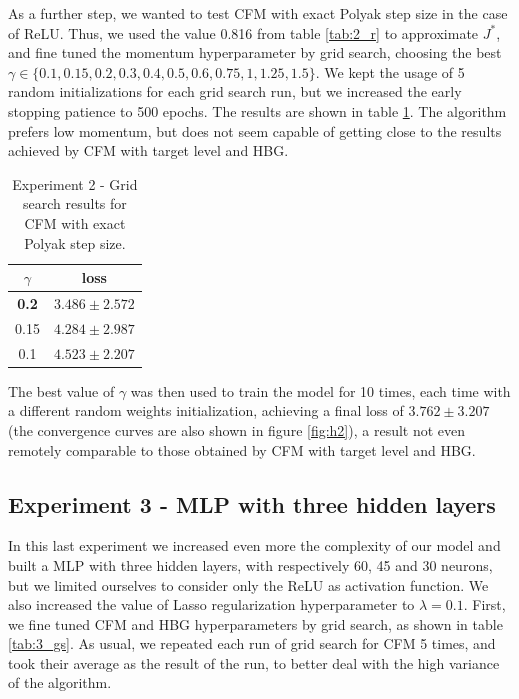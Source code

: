 As a further step, we wanted to test CFM with exact Polyak step size in the case of ReLU. Thus, we used the value 0.816 from table \ref{tab:2_r} to approximate $J^*$, and fine tuned the momentum hyperparameter by grid search, choosing the best $\gamma \in \{0.1, 0.15, 0.2, 0.3, 0.4, 0.5, 0.6, 0.75, 1, 1.25, 1.5\}$. We kept the usage of 5 random initializations for each grid search run, but we increased the early stopping patience to 500 epochs. The results are shown in table \ref{tab:2_bl_r}. The algorithm prefers low momentum, but does not seem capable of getting close to the results achieved by CFM with target level and HBG.

\begin{table}[htbp]
    \centering
    \begin{tabular}{|c c|}
        \hline
        $\gamma$ & loss \\
        \hline
        \textbf{0.2} & $\mathbf{3.486 \pm 2.572}$ \\
        0.15 & $4.284 \pm 2.987$ \\
        0.1 & $4.523 \pm 2.207$ \\
        \hline
    \end{tabular}
    \caption{Experiment 2 - Grid search results for CFM with exact Polyak step size.}
    \label{tab:2_bl_r}
\end{table}

The best value of $\gamma$ was then used to train the model for 10 times, each time with a different random weights initialization, achieving a final loss of $3.762 \pm 3.207$ (the convergence curves are also shown in figure \ref{fig:h2}), a result not even remotely comparable to those obtained by CFM with target level and HBG.

\subsection{Experiment 3 - MLP with three hidden layers}
\label{exp3}
In this last experiment we increased even more the complexity of our model and built a MLP with three hidden layers, with respectively 60, 45 and 30 neurons, but we limited ourselves to consider only the ReLU as activation function. We also increased the value of Lasso regularization hyperparameter to $\lambda =0.1$.
First, we fine tuned CFM and HBG hyperparameters by grid search, as shown in table \ref{tab:3_gs}. As usual, we repeated each run of grid search for CFM 5 times, and took their average as the result of the run, to better deal with the high variance of the algorithm.


